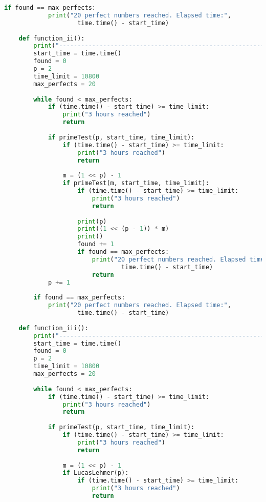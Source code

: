 \documentclass[11pt,twoside,openany]{memoir}
\begin{document}
\begin{lstlisting}[language=Python, basicstyle=\ttfamily\tiny,]
        if found == max_perfects:
            print("20 perfect numbers reached. Elapsed time:",
                    time.time() - start_time)
    
    def function_ii():
        print("----------------------------------------------------------------")
        start_time = time.time()
        found = 0
        p = 2
        time_limit = 10800 
        max_perfects = 20
    
        while found < max_perfects:
            if (time.time() - start_time) >= time_limit:
                print("3 hours reached")
                return
    
            if primeTest(p, start_time, time_limit):
                if (time.time() - start_time) >= time_limit:
                    print("3 hours reached")
                    return
    
                m = (1 << p) - 1
                if primeTest(m, start_time, time_limit):
                    if (time.time() - start_time) >= time_limit:
                        print("3 hours reached")
                        return
    
                    print(p)
                    print((1 << (p - 1)) * m)
                    print()
                    found += 1
                    if found == max_perfects:
                        print("20 perfect numbers reached. Elapsed time:",
                                time.time() - start_time)
                        return
            p += 1
    
        if found == max_perfects:
            print("20 perfect numbers reached. Elapsed time:",
                    time.time() - start_time)
    
    def function_iii():
        print("----------------------------------------------------------------")
        start_time = time.time()
        found = 0
        p = 2
        time_limit = 10800
        max_perfects = 20
    
        while found < max_perfects:
            if (time.time() - start_time) >= time_limit:
                print("3 hours reached")
                return
    
            if primeTest(p, start_time, time_limit):
                if (time.time() - start_time) >= time_limit:
                    print("3 hours reached")
                    return
    
                m = (1 << p) - 1
                if LucasLehmer(p):
                    if (time.time() - start_time) >= time_limit:
                        print("3 hours reached")
                        return
    

\end{lstlisting}
\end{document}
